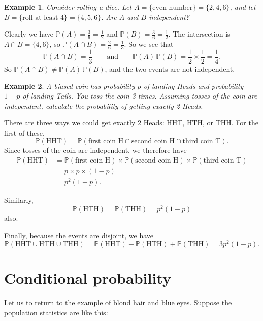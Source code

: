 \documentclass[
  a4paper,
]{book}
\theoremstyle{definition}
\theoremstyle{definition}
\newtheorem{example}{Example}[chapter]
\theoremstyle{definition}
\theoremstyle{definition}
\theoremstyle{remark}
\begin{document}
\begin{example}
\emph{Consider rolling a dice. Let \(A = \{\text{even number}\} = \{2,4,6\}\), and let \(B = \{\text{roll at least 4}\} = \{4,5,6\}\). Are \(A\) and \(B\) independent?}

Clearly we have \(\mathbb P(A) = \frac36 = \frac12\) and \(\mathbb P(B) = \frac 36 = \frac12\). The intersection is \(A \cap B = \{4,6\}\), so \(\mathbb P(A \cap B) = \frac26 = \frac13\). So we see that
\[ \mathbb P(A\cap B) = \frac13  \qquad \text{and} \qquad  \mathbb P(A)\, \mathbb P(B) = \frac12 \times \frac12 = \frac14 . \]
So \(\mathbb P(A \cap B) \neq \mathbb P(A)\, \mathbb P(B)\), and the two events are not independent.
\end{example}

\begin{example}
\emph{A biased coin has probability \(p\) of landing Heads and probability \(1-p\) of landing Tails. You toss the coin 3 times. Assuming tosses of the coin are independent, calculate the probability of getting exactly 2 Heads.}

There are three ways we could get exactly 2 Heads: HHT, HTH, or THH. For the first of these,
\[ \mathbb P(\text{HHT}) = \mathbb P(\text{first coin H} \cap \text{second coin H} \cap \text{third coin T}) . \]
Since tosses of the coin are independent, we therefore have
\begin{align*}
\mathbb P(\text{HHT})
  &= \mathbb P(\text{first coin H}) \times \mathbb P ( \text{second coin H} )\times \mathbb P(\text{third coin T}) \\
  &=p \times p \times (1-p) \\
  &= p^2(1-p).
\end{align*}

Similarly,
\[ \mathbb P(\text{HTH}) = \mathbb P(\text{THH}) = p^2(1-p) \]
also.

Finally, because the events are disjoint, we have
\[ \mathbb P(\text{HHT} \cup\text{HTH} \cup \text{THH}) = \mathbb P(\text{HHT} ) + \mathbb P(\text{HTH}) + \mathbb P(\text{THH}) = 3p^2(1-p) . \]
\end{example}

\hypertarget{conditional}{%
\section{Conditional probability}\label{conditional}}

Let us to return to the example of blond hair and blue eyes. Suppose the population statistics are like this:
\end{document}
